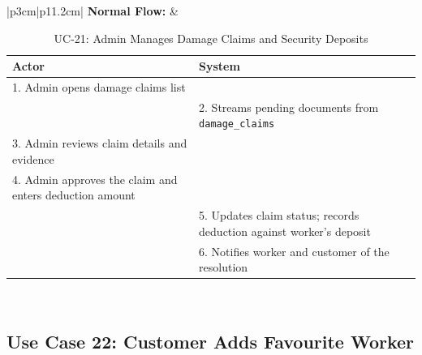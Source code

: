 \newpage

{\small
\renewcommand{\arraystretch}{1.05}
\begin{table}[H]
\centering
\begin{tabular}{|p{3cm}|p{11.2cm}|}
\hline
\textbf{Normal Flow:} &
\begin{tabular}[t]{|p{5.4cm}|p{5.4cm}|}
\hline
\textbf{Actor} & \textbf{System} \\ \hline
1. Admin opens damage claims list & \\ \hline
 & 2. Streams pending documents from \texttt{damage\_claims} \\ \hline
3. Admin reviews claim details and evidence & \\ \hline
4. Admin approves the claim and enters deduction amount & \\ \hline
 & 5. Updates claim status; records deduction against worker's deposit \\ \hline
 & 6. Notifies worker and customer of the resolution \\ \hline
\end{tabular} \\ \hline
\end{tabular}
\caption{UC-21: Admin Manages Damage Claims and Security Deposits}
\end{table}
}

\newpage


\subsection*{Use Case 22: Customer Adds Favourite Worker}

